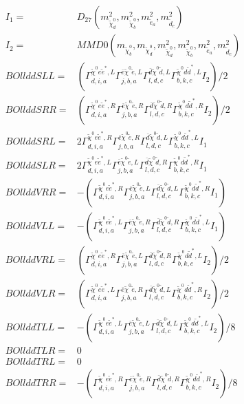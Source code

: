 \documentclass[A4,landscape]{article}
\begin{document}
\begin{align} 
I_1 = & D_{27}(m^2_{\tilde{\chi}^0_{{d}}}, m^2_{\tilde{\chi}^0_{{b}}}, m^2_{\tilde{e}_{{a}}}, m^2_{\tilde{d}_{{c}}}) \\ 
I_2 = & MMD0(m_{\tilde{\chi}^0_{{b}}}, m_{\tilde{\chi}^0_{{d}}}, m^2_{\tilde{\chi}^0_{{d}}}, m^2_{\tilde{\chi}^0_{{b}}}, m^2_{\tilde{e}_{{a}}}, m^2_{\tilde{d}_{{c}}}) \\ 
  BOllddSLL= & ( \Gamma^{\tilde{\chi}^0 e \tilde{e}^*,L}_{d, i, a} \Gamma^{\bar{e}\tilde{\chi}^0 \tilde{e} ,L}_{j, b, a} \Gamma^{\bar{d}\tilde{\chi}^0 \tilde{d} ,L}_{l, d, c} \Gamma^{\tilde{\chi}^0 d \tilde{d}^*,L}_{b, k, c} I_2)/2 \\ 
  BOllddSRR= & ( \Gamma^{\tilde{\chi}^0 e \tilde{e}^*,R}_{d, i, a} \Gamma^{\bar{e}\tilde{\chi}^0 \tilde{e} ,R}_{j, b, a} \Gamma^{\bar{d}\tilde{\chi}^0 \tilde{d} ,R}_{l, d, c} \Gamma^{\tilde{\chi}^0 d \tilde{d}^*,R}_{b, k, c} I_2)/2 \\ 
  BOllddSRL= & 2  \Gamma^{\tilde{\chi}^0 e \tilde{e}^*,R}_{d, i, a} \Gamma^{\bar{e}\tilde{\chi}^0 \tilde{e} ,R}_{j, b, a} \Gamma^{\bar{d}\tilde{\chi}^0 \tilde{d} ,L}_{l, d, c} \Gamma^{\tilde{\chi}^0 d \tilde{d}^*,L}_{b, k, c} I_1 \\ 
  BOllddSLR= & 2  \Gamma^{\tilde{\chi}^0 e \tilde{e}^*,L}_{d, i, a} \Gamma^{\bar{e}\tilde{\chi}^0 \tilde{e} ,L}_{j, b, a} \Gamma^{\bar{d}\tilde{\chi}^0 \tilde{d} ,R}_{l, d, c} \Gamma^{\tilde{\chi}^0 d \tilde{d}^*,R}_{b, k, c} I_1 \\ 
  BOllddVRR= & -( \Gamma^{\tilde{\chi}^0 e \tilde{e}^*,R}_{d, i, a} \Gamma^{\bar{e}\tilde{\chi}^0 \tilde{e} ,L}_{j, b, a} \Gamma^{\bar{d}\tilde{\chi}^0 \tilde{d} ,L}_{l, d, c} \Gamma^{\tilde{\chi}^0 d \tilde{d}^*,R}_{b, k, c} I_1) \\ 
  BOllddVLL= & -( \Gamma^{\tilde{\chi}^0 e \tilde{e}^*,L}_{d, i, a} \Gamma^{\bar{e}\tilde{\chi}^0 \tilde{e} ,R}_{j, b, a} \Gamma^{\bar{d}\tilde{\chi}^0 \tilde{d} ,R}_{l, d, c} \Gamma^{\tilde{\chi}^0 d \tilde{d}^*,L}_{b, k, c} I_1) \\ 
  BOllddVRL= & ( \Gamma^{\tilde{\chi}^0 e \tilde{e}^*,R}_{d, i, a} \Gamma^{\bar{e}\tilde{\chi}^0 \tilde{e} ,L}_{j, b, a} \Gamma^{\bar{d}\tilde{\chi}^0 \tilde{d} ,R}_{l, d, c} \Gamma^{\tilde{\chi}^0 d \tilde{d}^*,L}_{b, k, c} I_2)/2 \\ 
  BOllddVLR= & ( \Gamma^{\tilde{\chi}^0 e \tilde{e}^*,L}_{d, i, a} \Gamma^{\bar{e}\tilde{\chi}^0 \tilde{e} ,R}_{j, b, a} \Gamma^{\bar{d}\tilde{\chi}^0 \tilde{d} ,L}_{l, d, c} \Gamma^{\tilde{\chi}^0 d \tilde{d}^*,R}_{b, k, c} I_2)/2 \\ 
  BOllddTLL= & -( \Gamma^{\tilde{\chi}^0 e \tilde{e}^*,L}_{d, i, a} \Gamma^{\bar{e}\tilde{\chi}^0 \tilde{e} ,L}_{j, b, a} \Gamma^{\bar{d}\tilde{\chi}^0 \tilde{d} ,L}_{l, d, c} \Gamma^{\tilde{\chi}^0 d \tilde{d}^*,L}_{b, k, c} I_2)/8 \\ 
  BOllddTLR= & 0 \\ 
  BOllddTRL= & 0 \\ 
  BOllddTRR= & -( \Gamma^{\tilde{\chi}^0 e \tilde{e}^*,R}_{d, i, a} \Gamma^{\bar{e}\tilde{\chi}^0 \tilde{e} ,R}_{j, b, a} \Gamma^{\bar{d}\tilde{\chi}^0 \tilde{d} ,R}_{l, d, c} \Gamma^{\tilde{\chi}^0 d \tilde{d}^*,R}_{b, k, c} I_2)/8 \\ 
\end{align} 
\end{document}
